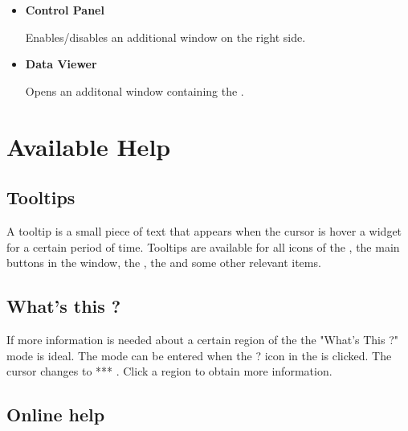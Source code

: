 	 \begin{itemize}
	 \item {\bf Control Panel} 

	 Enables/disables an additional window on the right side. 
    
    
    

	 \item {\bf Data Viewer} 

	 Opens an additonal window containing the {\covise} {\mydataviewer} . 

	 \end{itemize}









	 \section{Available Help}
	 \label{help}


	 \subsection{Tooltips}
	 \label{tooltips}


	 A tooltip is a small piece of text that appears  when the cursor is hover a widget for a certain period of time.
    Tooltips are available for all icons of the {\mytoolbar}, the main buttons in the {\myparameter} window,   
	 the {\mycontrol}, the {\mysetting} and some other relevant items. 
    
    
	 \subsection{What's this ?}
	 \label{whatsthis}

    If more information is needed about a certain region of the {\mapeditor} the "What's This ?" mode is ideal. 
    The mode can be entered when the ? icon in the  {\mytoolbar} is clicked. The cursor changes to *** . Click a region 
    to obtain more information.
    
    
    \subsection{Online help}
    
